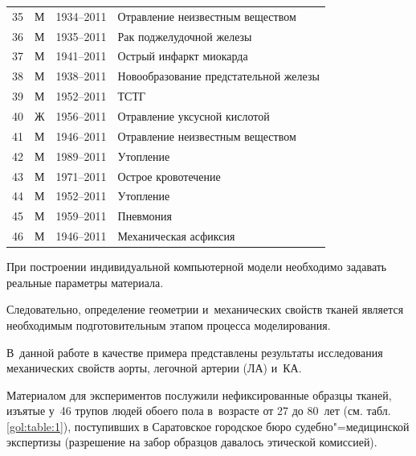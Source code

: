 \begin{table}[p!]
\begin{tabular}{r|c|c|l}
35 & М & 1934--2011 & Отравление неизвестным веществом \\

36 & М & 1935--2011 & Рак поджелудочной железы \\

37 & М & 1941--2011 & Острый инфаркт миокарда \\

38 & М & 1938--2011 & Новообразование предстательной железы \\

39 & М & 1952--2011 & ТСТГ \\

40 & Ж & 1956--2011 & Отравление уксусной кислотой \\

41 & М & 1946--2011 & Отравление неизвестным веществом \\

42 & М & 1989--2011 & Утопление \\

43 & М & 1971--2011 & Острое кровотечение \\

44 & М & 1952--2011 & Утопление \\

45 & М & 1959--2011 & Пневмония \\

46 & М & 1946--2011 & Механическая асфиксия \\

\hline

\end{tabular}

\end{table}



\smallskip




При построении индивидуальной компьютерной модели необходимо задавать реальные параметры материала. 

Следовательно, определение геометрии и~механических свойств тканей является необходимым подготовительным этапом процесса моделирования. 

В~данной работе в качестве примера представлены результаты исследования механических свойств аорты, легочной артерии (ЛА) и~КА. 

Материалом для экспериментов послужили нефиксированные образцы тканей, изъятые у~46 трупов людей обоего пола в~возрасте от 27 до 80~лет (см. табл. \ref{gol:table:1}), поступивших в Саратовское городское бюро судебно"=медицинской экспертизы (разрешение на забор образцов давалось этической комиссией). 

